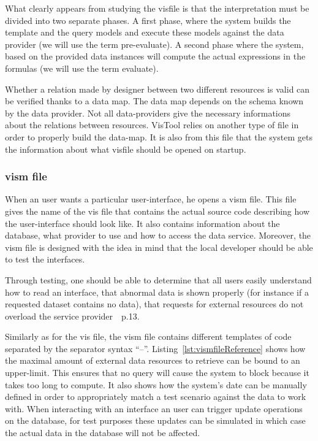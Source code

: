 What clearly appears from studying the visfile is that the interpretation must be divided into two separate phases. A first phase, where the system builds the template and the query models and execute these models against the data provider (we will use the term pre-evaluate). A second phase where the system, based on the provided data instances will compute the actual expressions in the formulas (we will use the term evaluate).

Whether a relation made by designer between two different resources is valid can be verified thanks to a data map. The data map depends on the schema known by the data provider. Not all data-providers give the necessary informations about the relations between resources. VisTool relies on another type of file in order to properly build the data-map. It is also from this file that the system gets the information about what visfile should be opened on startup.

\subsubsection{vism file}
When an user wants a particular user-interface, he opens a vism file. This file gives the name of the vis file that contains the actual source code describing how the user-interface should look like. It also contains information about the database, what provider to use and how to access the data service. Moreover, the vism file is designed with the idea in mind that the local developer should be able to test the interfaces.

Through testing, one should be able to determine that all users easily understand how to read an interface, that abnormal data is shown properly (for instance if a requested dataset contains no data), that requests for external resources do not overload the service provider~\cite{lauesen2013}~p.13. 



Similarly as for the vis file, the vism file contains different templates of code separated by the separator syntax ``--''. Listing~\ref{lst:vismfileReference} shows how the maximal amount of external data resources to retrieve can be bound to an upper-limit. This ensures that no query will cause the system to block because it takes too long to compute. It also shows how the system's date can be manually defined in order to appropriately match a test scenario against the data to work with. When interacting with an interface an user can trigger update operations on the database, for test purposes these updates can be simulated in which case the actual data in the database will not be affected.

